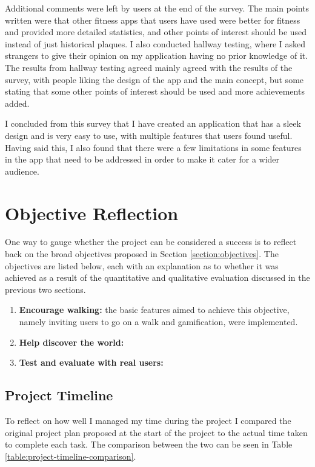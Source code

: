 Additional comments were left by users at the end of the survey. The main points written were that other fitness apps that users have used were better for fitness and provided more detailed statistics, and other points of interest should be used instead of just historical plaques. I also conducted hallway testing, where I asked strangers to give their opinion on my application having no prior knowledge of it. The results from hallway testing agreed mainly agreed with the results of the survey, with people liking the design of the app and the main concept, but some stating that some other points of interest should be used and more achievements added.

I concluded from this survey that I have created an application that has a sleek design and is very easy to use, with multiple features that users found useful. Having said this, I also found that there were a few limitations in some features in the app that need to be addressed in order to make it cater for a wider audience.

\section{Objective Reflection}


One way to gauge whether the project can be considered a success is to reflect back on the broad objectives proposed in Section \ref{section:objectives}. The objectives are listed below, each with an explanation as to whether it was achieved as a result of the quantitative and qualitative evaluation discussed in the previous two sections.

\begin{enumerate}[label=\textbf{Obj \arabic*}]
  \item \textbf{Encourage walking:} the basic features aimed to achieve this objective, namely inviting users to go on a walk and gamification, were implemented.
  \item \textbf{Help discover the world:}
  \item \textbf{Test and evaluate with real users:}
\end{enumerate}

\subsection{Project Timeline}

To reflect on how well I managed my time during the project I compared the original project plan proposed at the start of the project to the actual time taken to complete each task. The comparison between the two can be seen in Table \ref{table:project-timeline-comparison}.

